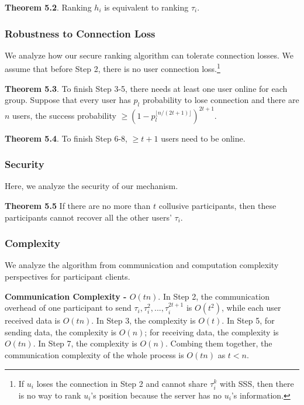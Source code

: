 \documentclass[11pt]{article}
\begin{document}
\vspace{+.5em}
\textbf{Theorem 5.2}. Ranking $h_i$ is equivalent to ranking $\tau_i$.


\subsubsection{Robustness to Connection Loss} We analyze how our secure ranking algorithm can tolerate connection losses. We assume that before Step 2, there is no user connection loss.\footnote{If $u_i$ loses the connection in Step 2 and cannot share $\tau_i^k$ with SSS, then there is no way to rank $u_i$'s position because the server has no $u_i$'s information.}

\vspace{+.5em}
\textbf{Theorem 5.3}. To finish Step 3-5, there needs at least one user online for each group. Suppose that every user has $p_l$ probability to lose connection and there are $n$ users, the success probability $\ge (1-p_l^{\lfloor n/(2t+1) \rfloor})^{2t+1}$.


\vspace{+.5em}
\textbf{Theorem 5.4}. To finish Step 6-8, $\ge t+1$ users need to be online.



\subsubsection{Security} Here, we analyze the security of our mechanism.

\vspace{+.5em}
\textbf{Theorem 5.5} If there are no more than $t$ collusive participants, then these participants cannot recover all the other users' $\tau_i$.






\subsubsection{Complexity} We analyze the algorithm from communication and computation complexity perspectives for participant clients.

\textbf{Communication Complexity - $O(tn)$}. In Step 2, the communication overhead of one participant to send $\tau_i,\tau_i^2,...,\tau_i^{2t+1}$ is $O(t^2)$, while each user received data is $O(tn)$. In Step 3, the complexity is $O(t)$. In Step 5, for sending data, the complexity is $O(n)$; for receiving data, the complexity is $O(tn)$. In Step 7, the complexity is $O(n)$. Combing them together, the communication complexity of the whole process is $O(tn)$ as $t<n$.
\end{document}
